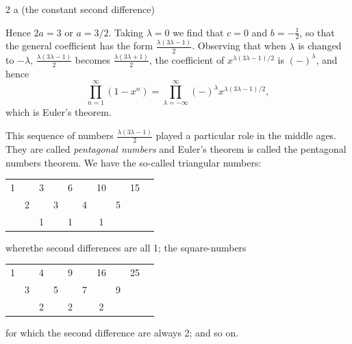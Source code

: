      \hspace{5cm} 2 a (the constant second difference) 

Hence $2a=3$ or $a=3/2$. Taking $\lambda= 0$ we find that $c=0$ and
$b=-\frac{1}{2}$, so that the general coefficient has the form
$\frac{\lambda (3 \lambda-1)}{2}$. Observing that when $\lambda$ is
changed to $-\lambda$, $\frac{\lambda(3 \lambda-1)}{2}$ becomes
$\frac{\lambda(3 \lambda+1)}{2}$, the coefficient of $x^{\lambda(3
  \lambda-1)/2}$ is $(-)^\lambda$, and hence 
\begin{equation*}
  \prod^\infty_{n=1} (1-x^n) = \prod^\infty_{\lambda=- \infty}
  (-)^\lambda x^{\lambda(3 \lambda-1)/2}, \tag{4}\label{part1:lec3:eq4}  
\end{equation*}
which is Euler's theorem.

This sequence of numbers $\frac{\lambda(3 \lambda-1)}{2}$ played a
particular role in the middle ages. They are called \textit{pentagonal
numbers} and Euler's theorem is called the pentagonal numbers
theorem. We have the so-called triangular numbers:

\medskip 
\begin{center}
  \begin{tabular}{cccccccccc}
    1&&3&&6&&10&&15&\\[5pt]
    &2&&3&&4&&5&&\\[5pt]
    &&1&&1&&1&&
  \end{tabular}
\end{center}
where\pageoriginale  the second differences are all 1; the square-numbers

\medskip 
\begin{center}
  \begin{tabular}{cccccccccc}
    1&&4&&9&&16&&25&\\[5pt]
    &3&&5&&7&&9&&\\[5pt]
    &&2&&2&&2&&
  \end{tabular}
\end{center}
for which the second difference are always 2; and so on.

\begin{figure}[H]
\end{figure}

